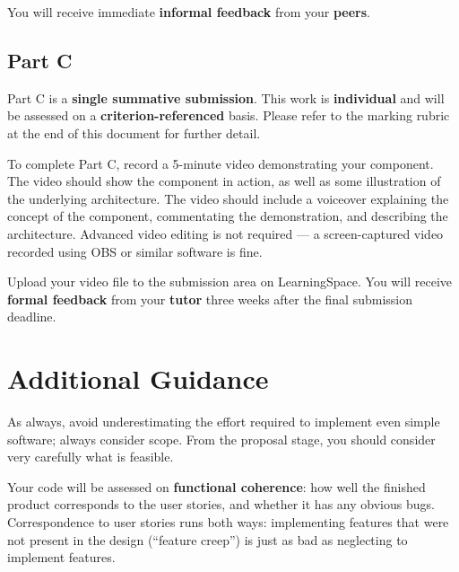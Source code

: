 \documentclass{../../fal_assignment}
\begin{document}
You will receive immediate \textbf{informal feedback} from your \textbf{peers}.

\subsection*{Part C}

Part C is a \textbf{single summative submission}. This work is \textbf{individual} and will be assessed on a \textbf{criterion-referenced} basis. Please refer to the marking rubric at the end of this document for further detail.

To complete Part C, record a 5-minute video demonstrating your component.
The video should show the component in action, as well as some illustration of the underlying architecture.
The video should include a voiceover explaining the concept of the component,
commentating the demonstration, and describing the architecture.
Advanced video editing is not required --- a screen-captured video recorded using OBS or similar software is fine.

Upload your video file to the submission area on LearningSpace. You will receive \textbf{formal feedback} from your \textbf{tutor} three weeks after the final submission deadline.

\section*{Additional Guidance}

As always, avoid underestimating the effort required to implement even simple software; always consider scope.
From the proposal stage, you should consider very carefully what is feasible.

Your code will be assessed on \textbf{functional coherence}:
how well the finished product corresponds to the user stories,
and whether it has any obvious bugs.
Correspondence to user stories runs both ways:
implementing features that were not present in the design (``feature creep'')
is just as bad as neglecting to implement features.

\end{document}
